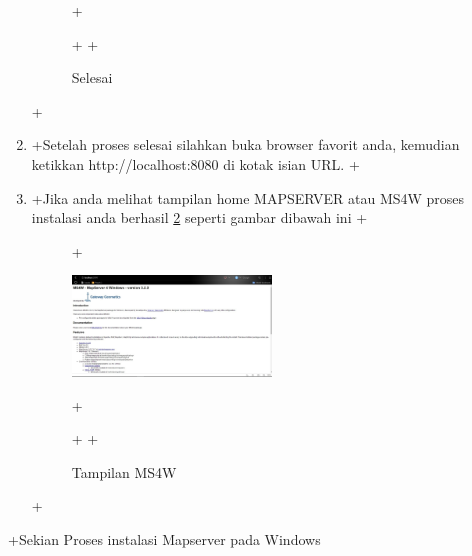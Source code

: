 \begin{enumerate}
\begin{figure}[ht]
 +	    \caption{Selesai}
 +		\label{gambar3}
 +		\end{figure}
 +\item
 +Setelah proses selesai silahkan buka browser favorit anda, kemudian ketikkan http://localhost:8080 di kotak isian URL.
 +\item
 +Jika anda melihat tampilan home MAPSERVER atau MS4W proses instalasi anda berhasil \ref{gambar4} seperti gambar dibawah ini
 +\begin{figure}[ht]
 +	    \centerline{\includegraphics[width=0.50\textwidth]{figures/img4}}
 +	    \caption{Tampilan MS4W}
 +		\label{gambar4}
 +		\end{figure}
 +\end{enumerate}
 +Sekian Proses instalasi Mapserver pada Windows
